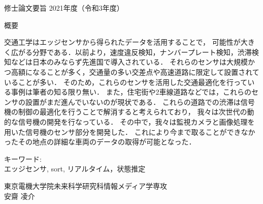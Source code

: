 \newpage
\pagestyle{plain}
\begin{center}
\LARGE{修士論文要旨 \hspace{10mm} 2021年度（令和3年度）}\\

\vspace{10mm}

\end{center}

\begin{center}
概要\\
\end{center}
交通工学はエッジセンサから得られたデータを活用することで，
可能性が大きく広がる分野である．以前より，速度違反検知，ナンバープレート検知，渋滞検知などは日本のみならず先進国で導入されている．
それらのセンサは大規模かつ高額になることが多く，交通量の多い交差点や高速道路に限定して設置されていることが多い．
そのため，これらのセンサを活用した交通最適化を行っている事例は筆者の知る限り無い．
また，住宅街や2車線道路などでは，これらのセンサの設置がまだ進んでいないのが現状である．
これらの道路での渋滞は信号機の制御の最適化を行うことで解消すると考えられており，
我々は次世代の動的な信号機の開発を行なっている．
その中で，我々は監視カメラと画像処理を用いた信号機のセンサ部分を開発した．
これにより今まで取ることができなかったその地点の詳細な車両のデータの取得が可能となった．


\begin{flushleft}キーワード:\\
エッジセンサ, sort, リアルタイム，状態推定
\end{flushleft}


\begin{center}
\vspace{10mm}
\begin{flushright}\large 東京電機大学院未来科学研究科情報メディア学専攻\\
\LARGE 安齋 凌介\\
\end{flushright}
\end{center}
